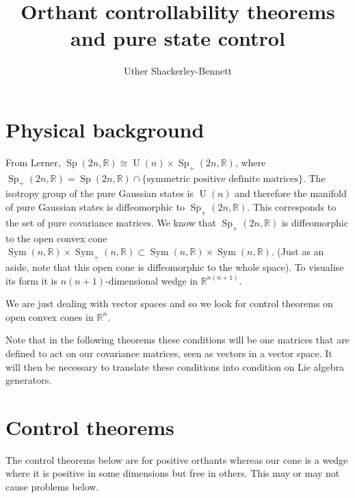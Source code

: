 


 \title{Orthant controllability theorems and pure state control}
\author{Uther Shackerley-Bennett}
\maketitle


\tableofcontents

\section{Physical background}
From Lerner, $\operatorname{Sp}(2n,\mathbb{R}) \cong \operatorname{U}(n)\times \operatorname{Sp}_+(2n,\mathbb{R})$, where $\operatorname{Sp}_+(2n,\mathbb{R}) = \operatorname{Sp}(2n,\mathbb{R}) \cap \{\text{symmetric positive definite matrices}\}$. The isotropy group of the pure Gaussian states is $\operatorname{U}(n)$ and therefore the manifold of pure Gaussian states is diffeomorphic to $\operatorname{Sp}_+(2n,\mathbb{R})$. This corresponds to the set of pure covariance matrices. We know that $\operatorname{Sp}_+(2n,\mathbb{R})$ is diffeomorphic to the open convex cone $\operatorname{Sym}(n,\mathbb{R}) \times \operatorname{Sym}_+(n,\mathbb{R}) \subset \operatorname{Sym}(n,\mathbb{R}) \times \operatorname{Sym}(n,\mathbb{R})$. (Just as an aside, note that this open cone is diffeomorphic to the whole space). To visualise its form it is $n(n+1)$-dimensional wedge in $\mathbb{R}^{n(n+1)}$.

We are just dealing with vector spaces and so we look for control theorems on open convex cones in $\mathbb{R}^n$.

Note that in the following theorems these conditions will be one matrices that are defined to act on our covariance matrices, seen as vectors in a vector space. It will then be necessary to translate these conditions into condition on Lie algebra generators.

\section{Control theorems}
The control theorems below are for positive orthants whereas our cone is a wedge where it is positive in some dimensions but free in others. This may or may not cause problems below.

